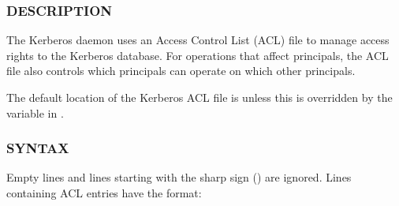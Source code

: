 \documentclass[letterpaper,10pt,english]{sphinxmanual}
\begin{document}
\subsubsection{DESCRIPTION}
\label{\detokenize{admin/conf_files/kadm5_acl:description}}
The Kerberos {\hyperref[\detokenize{admin/admin_commands/kadmind:kadmind-8}]{}} daemon uses an Access Control List
(ACL) file to manage access rights to the Kerberos database.
For operations that affect principals, the ACL file also controls
which principals can operate on which other principals.

The default location of the Kerberos ACL file is
{\hyperref[\detokenize{mitK5defaults:paths}]{}}  unless this is overridden by the 
variable in {\hyperref[\detokenize{admin/conf_files/kdc_conf:kdc-conf-5}]{}}.


\subsubsection{SYNTAX}
\label{\detokenize{admin/conf_files/kadm5_acl:syntax}}
Empty lines and lines starting with the sharp sign (\sphinxcode{\#}) are
ignored.  Lines containing ACL entries have the format:

%
\begin{sphinxVerbatim}[commandchars=\\\{\}]
    \PYG{p}{[}  \PYG{p}{[}\PYG{p}{]} \PYG{p}{]}
\end{sphinxVerbatim}
\end{document}
